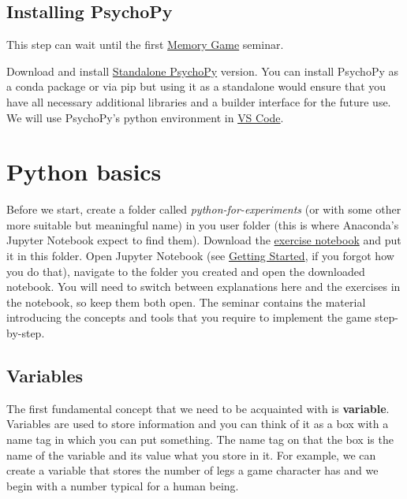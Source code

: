 \documentclass[
]{book}
\begin{document}
\hypertarget{install-psychopy}{%
\section*{Installing PsychoPy}\label{install-psychopy}}

This step can wait until the first \protect\hyperlink{memory-game-01}{Memory Game} seminar.

Download and install \href{https://www.psychopy.org/download.html}{Standalone PsychoPy} version. You can install PsychoPy as a conda package or via pip but using it as a standalone would ensure that you have all necessary additional libraries and a builder interface for the future use. We will use PsychoPy's python environment in \protect\hyperlink{install-vs-code}{VS Code}.

\hypertarget{seminar01}{%
\chapter{Python basics}\label{seminar01}}

Before we start, create a folder called \emph{python-for-experiments} (or with some other more suitable but meaningful name) in you user folder (this is where Anaconda's Jupyter Notebook expect to find them). Download the \href{notebooks/Seminar\%2001.\%20Basics.ipynb}{exercise notebook} and put it in this folder. Open Jupyter Notebook (see \protect\hyperlink{getting-started}{Getting Started}, if you forgot how you do that), navigate to the folder you created and open the downloaded notebook. You will need to switch between explanations here and the exercises in the notebook, so keep them both open. The seminar contains the material introducing the concepts and tools that you require to implement the game step-by-step.

\hypertarget{variables}{%
\section{Variables}\label{variables}}

The first fundamental concept that we need to be acquainted with is \textbf{variable}. Variables are used to store information and you can think of it as a box with a name tag in which you can put something. The name tag on that the box is the name of the variable and its value what you store in it. For example, we can create a variable that stores the number of legs a game character has and we begin with a number typical for a human being.
\end{document}
